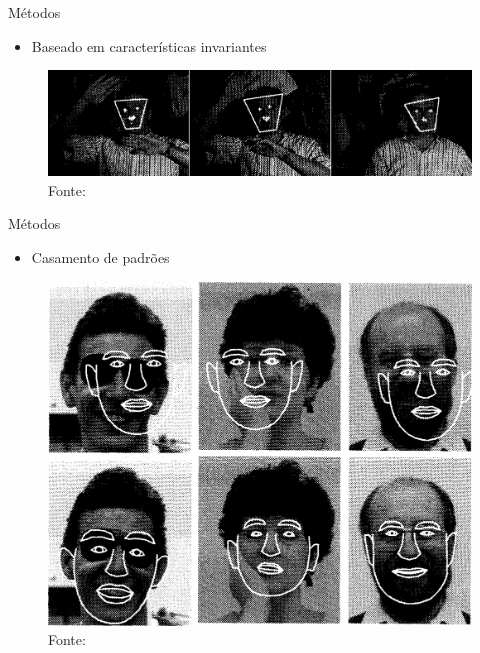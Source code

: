 \begin{frame}{Métodos}
\begin{itemize}
    \item Baseado em características invariantes
\end{itemize}

\begin{figure}[htbp]
    \caption{Fonte: }
    \centering
    \includegraphics[height=0.6\textheight,width=\textwidth]{imagens/leung.png}
\end{figure}
\end{frame}


\begin{frame}{Métodos}
\begin{itemize}
    \item Casamento de padrões
\end{itemize}

\begin{figure}[htbp]
    \caption{Fonte: }
    \centering
    \includegraphics[height=0.6\textheight]{imagens/lanitis_template.png}
\end{figure}
\end{frame}


